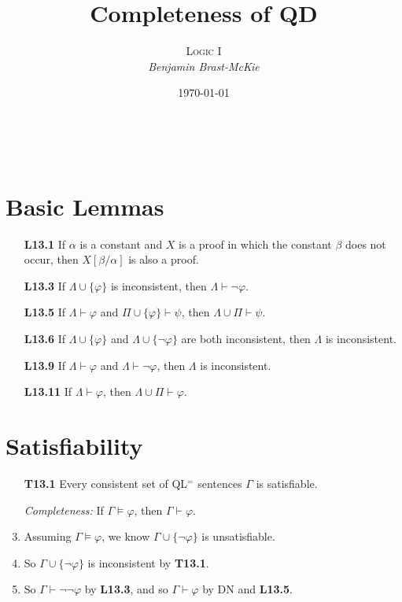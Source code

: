 \documentclass[a4paper, 11pt]{article} %
\title{\textbf{Completeness of QD}} %
\author{\textsc{Logic I}\\ \em Benjamin Brast-McKie} %
\date{\today} %
\makeatletter
\def\proves{\ensuremath{\vdash}}
\newcommand{\set}[1]{\lbrace#1\rbrace} %
\newcommand{\unisub}[2]{[#1/#2]}
\renewcommand{\models}{\vDash}
\def\metaA{\ensuremath{\varphi}}
\def\metaB{\ensuremath{\psi}}
\renewcommand{\maketitle}{ %
\begin{flushright} %
{\LARGE\@title} %

\vspace{10pt} %

{\@author} %
\\\@date %

\vspace{-40pt} %
\end{flushright}
}
\makeatother
\begin{document}
\maketitle %

\thispagestyle{empty}



\section*{Basic Lemmas}

\begin{enumerate}
  \item[\bf L13.1] If $\alpha$ is a constant and $X$ is a proof in which the constant $\beta$ does not occur, then $X\unisub{\beta}{\alpha}$ is also a proof. 
  \item[\bf L13.3] If $\Lambda\cup\set{\metaA}$ is inconsistent, then $\Lambda\proves\neg\metaA$.
  \item[\bf L13.5] If $\Lambda \proves \metaA$ and $\Pi\cup\set{\metaA} \proves \metaB$, then $\Lambda\cup\Pi \proves \metaB$.
  \item[\bf L13.6] If $\Lambda \cup \set{\metaA}$ and $\Lambda\cup \set{\neg\metaA}$ are both inconsistent, then $\Lambda$ is inconsistent.
  \item[\bf L13.9] If $\Lambda\proves\metaA$ and $\Lambda\proves\neg\metaA$, then $\Lambda$ is inconsistent.
  \item[\bf L13.11] If $\Lambda\proves\metaA$, then $\Lambda\cup\Pi\proves\metaA$.
\end{enumerate}


\section*{Satisfiability}

\begin{enumerate}
  \item[\bf T13.1] Every consistent set of QL$^=$ sentences $\Gamma$ is satisfiable.
  \item[\it Completeness:] If $\Gamma\models\metaA$, then $\Gamma\proves\metaA$.
  \item Assuming $\Gamma\models\metaA$, we know $\Gamma\cup\set{\neg\metaA}$ is unsatisfiable.
  \item So $\Gamma\cup\set{\neg\metaA}$ is inconsistent by \textbf{T13.1}.
  \item So $\Gamma\proves\neg\neg\metaA$ by \textbf{L13.3}, and so $\Gamma\proves\metaA$ by DN and \textbf{L13.5}.
\end{enumerate}
\end{document}
